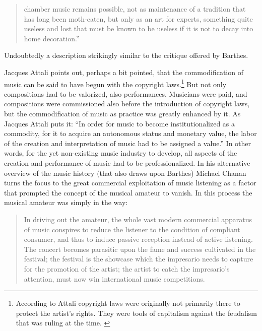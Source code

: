 \documentclass[11pt]{article}
\begin{document}
\begin{quote}
  chamber music remains possible, not as maintenance of a tradition
  that has long been moth-eaten, but only as an art for experts,
  something quite useless and lost that must be known to be useless if
  it is not to decay into home decoration.'' \citep[p.102-3]{adorno76}
\end{quote}
Undoubtedly a description strikingly similar to the critique offered by Barthes.

Jacques Attali points out, perhaps a bit pointed, that the commodification of music can be said to have begun with the copyright laws.\footnote{According to Attali copyright laws were originally not primarily there to protect the artist's rights. They were tools of capitalism against the feudalism that was ruling at the time. \citep[p.52]{attali85}}
But not only compositions had to be valorized, also performances. Musicians were paid, and compositions were commissioned also before the introduction of copyright laws, but the commodification of music as practice was greatly enhanced by it. As Jacques Attali puts it: ``In order for music to become institutionalized as a commodity, for it to acquire an autonomous status and monetary value, the labor of the creation and interpretation of music had to be assigned a value.'' \citep[p.51]{attali85} In other words, for the yet non-existing music industry to develop, all aspects of the creation and performance of music had to be professionalized. In his alternative overview of the music history (that also draws upon Barthes) Michael Chanan turns the focus to the great commercial exploitation of music listening as a factor that prompted the concept of the musical amateur to vanish. In this process the musical amateur was simply in the way:

\begin{quote}
In driving out the amateur, the whole vast modern commercial apparatus of music conspires to reduce the listener to the condition of compliant consumer, and thus to induce passive reception instead of active listening. The concert becomes parasitic upon the fame and success cultivated in the festival; the festival is the showcase which the impresario needs to capture for the promotion of the artist; the artist to catch the impresario's attention, must now win international music competitions. \citep[p.29]{chanan1994}
\end{quote}
\end{document}

